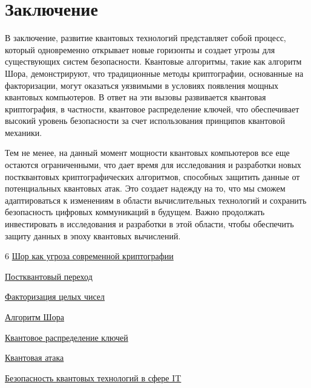 \documentclass[12pt]{article}
\begin{document}
\newpage

\section{Заключение}

В заключение, развитие квантовых технологий представляет собой процесс, который одновременно открывает новые горизонты и создает угрозы для существующих систем безопасности. Квантовые алгоритмы, такие как алгоритм Шора, демонстрируют, что традиционные методы криптографии, основанные на факторизации, могут оказаться уязвимыми в условиях появления мощных квантовых компьютеров. В ответ на эти вызовы развивается квантовая криптография, в частности, квантовое распределение ключей, что обеспечивает высокий уровень безопасности за счет использования принципов квантовой механики.

Тем не менее, на данный момент мощности квантовых компьютеров все еще остаются ограниченными, что дает время для исследования и разработки новых постквантовых криптографических алгоритмов, способных защитить данные от потенциальных квантовых атак. Это создает надежду на то, что мы сможем адаптироваться к изменениям в области вычислительных технологий и сохранить безопасность цифровых коммуникаций в будущем. Важно продолжать инвестировать в исследования и разработки в этой области, чтобы обеспечить защиту данных в эпоху квантовых вычислений. 

\newpage

\begin{thebibliography}{6}
     \href{https://habr.com/ru/articles/592413}{Шор как угроза современной криптографии}

     \href{https://www.gazprombank.tech/blog/694}{Постквантовый переход}
    
     \href{https://en.wikipedia.org/wiki/Factorization}{Факторизация целых чисел}
    
     \href{https://qsim.tsu.ru/lectures/Shor's_algorithm}{Алгоритм Шора} 

     \href{https://www.drishtiias.com/daily-news-analysis/quantum-key-distribution-technology/print_manually}{Квантовое распределение ключей}

     \href{https://qapp.tech/help/quantum-threat}{Квантовая атака}

     \href{https://www.ptsecurity.com/ru-ru/research/analytics/bezopasnost-kvantovyh-technologiy-v-sphere-it/}{Безопасность квантовых технологий в сфере IT}

\end{thebibliography}
\end{document}
